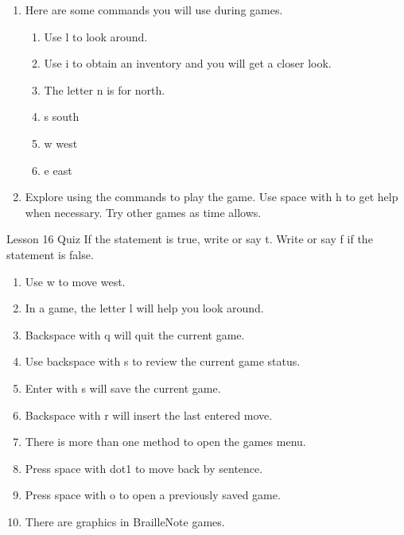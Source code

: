 \documentclass[10pt,letterpaper,twoside]{report}
\begin{document}
{{{\begin{enumerate}
\begin{enumerate}
\begin{enumerate}
		            \end{enumerate}
		      \item Here are some commands you will use during games.
		            \begin{enumerate}
			            \item Use l to look around.
			            \item Use i to obtain an inventory and you will get a closer look.
			            \item The letter n is for north.
			            \item s south
			            \item w west
			            \item e east
		            \end{enumerate}
		      \item Explore using the commands to play the game.  Use space with h to get help when necessary.  Try other games as time allows.
	      \end{enumerate}
	      \clearpage
	      \newpage
	      Lesson 16
	      Quiz
	      If the statement is true, write or say t.  Write or say f if the statement is false.
	      \begin{enumerate}
		      \item Use w to move west.
		      \item In a game, the letter l will help you look around.
		      \item Backspace with q will quit the current game.
		      \item Use backspace with s to review the current game status.
		      \item Enter with s will save the current game.
		      \item Backspace with r will insert the last entered move.
		      \item There is more than one method to open the games menu.
		      \item Press space with dot1 to move back by sentence.
		      \item Press space with o to open a previously saved game.
		      \item There are graphics in BrailleNote games.
	      \end{enumerate}
\end{enumerate}

\clearpage
}}}
\end{document}
